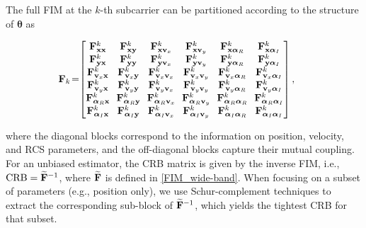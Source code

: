 \documentclass[9pt,final,journal,twocolumn]{IEEEtran}
\begin{document}
The full FIM at the $k$-th subcarrier can be partitioned according to the structure of $\bm\theta$ as
\begin{small}
\begin{align}\label{FIM_block}
\hspace*{-0.5em}{\bf F}_k  
\!=\!&\left[\begin{matrix}  
 {\bf F}^k_{{\bf x}{\bf x}} \!&\! {\bf F}^k_{{\bf x}{\bf y}} \!&\! {\bf F}^k_{{\bf x}{\bf v}_x} \!&\! {\bf F}^k_{{\bf x}{\bf v}_y} \!&\! {\bf F}^k_{{\bf x}{\bm\alpha}_R} \!&\! {\bf F}^k_{{\bf x}{\bm\alpha}_I}  \\
 {\bf F}^k_{{\bf y}{\bf x}} \!&\! {\bf F}^k_{{\bf y}{\bf y}} \!&\! {\bf F}^k_{{\bf y}{\bf v}_x} \!&\! {\bf F}^k_{{\bf y}{\bf v}_y} \!&\! {\bf F}^k_{{\bf y}{\bm\alpha}_R} \!&\! {\bf F}^k_{{\bf y}{\bm\alpha}_I}\\
  {\bf F}^k_{{\bf v}_x{\bf x}} \!&\! {\bf F}^k_{{\bf v}_x{\bf y}} \!&\! {\bf F}^k_{{\bf v}_x{\bf v}_x} \!&\! {\bf F}^k_{{\bf v}_x{\bf v}_y} \!&\! {\bf F}^k_{{\bf v}_x{\bm\alpha}_R} \!&\! {\bf F}^k_{{\bf v}_x{\bm\alpha}_I}\\
  {\bf F}^k_{{\bf v}_y{\bf x}} \!&\! {\bf F}^k_{{\bf v}_y{\bf y}} \!&\! {\bf F}^k_{{\bf v}_y{\bf v}_x} \!&\! {\bf F}^k_{{\bf v}_y{\bf v}_y} \!&\! {\bf F}^k_{{\bf v}_y{\bm\alpha}_R} \!&\! {\bf F}^k_{{\bf v}_y{\bm\alpha}_I}\\
  {\bf F}^k_{{\bm\alpha}_R{\bf x}} \!&\! {\bf F}^k_{{\bm\alpha}_R{\bf y}} \!&\! {\bf F}^k_{{\bm\alpha}_R{\bf v}_x} \!&\! {\bf F}^k_{{\bm\alpha}_R{\bf v}_y} \!&\! {\bf F}^k_{{\bm\alpha}_R{\bm\alpha}_R} \!&\! {\bf F}^k_{{\bm\alpha}_R{\bm\alpha}_I}\\
  {\bf F}^k_{{\bm\alpha}_I{\bf x}} \!&\! {\bf F}^k_{{\bm\alpha}_I{\bf y}} \!&\! {\bf F}^k_{{\bm\alpha}_I{\bf v}_x} \!&\! {\bf F}^k_{{\bm\alpha}_I{\bf v}_y} \!&\! {\bf F}^k_{{\bm\alpha}_I{\bm\alpha}_R} \!&\! {\bf F}^k_{{\bm\alpha}_I{\bm\alpha}_I}\\
    \end{matrix}\right],
\end{align}
\end{small}
\noindent\hspace{-1em} where the diagonal blocks correspond to the information on position, velocity, and RCS parameters, and the off-diagonal blocks capture their mutual coupling. For an unbiased estimator, the CRB matrix is given by the inverse FIM, i.e., ${\mathrm {CRB}}=\widetilde{\bf F}^{-1}$, where $\widetilde{\bf F}$ is defined in \eqref{FIM_wide-band}. When focusing on a subset of parameters (e.g., position only), we use Schur-complement techniques \cite{dokhanchi2019mmWave} to extract the corresponding sub-block of $\widetilde{\bf F}^{-1}$, which yields the tightest CRB for that subset. 
\end{document}
